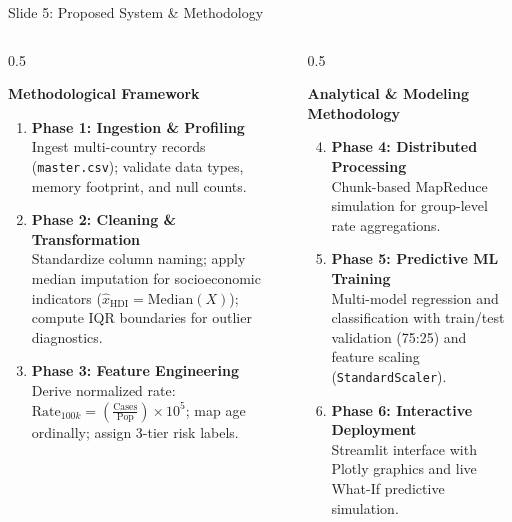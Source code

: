 \documentclass[10pt, aspectratio=169]{beamer}
\begin{document}
\begin{frame}{Slide 5: Proposed System \& Methodology}
    \begin{columns}[T]
        \begin{column}{0.5\textwidth}
            \begin{block}{\textbf{Methodological Framework}}
                \begin{enumerate}
                    \item \textbf{Phase 1: Ingestion \& Profiling} \\
                    Ingest multi-country records (\texttt{master.csv}); validate data types, memory footprint, and null counts.
                    \item \textbf{Phase 2: Cleaning \& Transformation} \\
                    Standardize column naming; apply median imputation for socioeconomic indicators ($\hat{x}_{\text{HDI}} = \text{Median}(X)$); compute IQR boundaries for outlier diagnostics.
                    \item \textbf{Phase 3: Feature Engineering} \\
                    Derive normalized rate: $\text{Rate}_{100k} = (\frac{\text{Cases}}{\text{Pop}}) \times 10^5$; map age ordinally; assign 3-tier risk labels.
                \end{enumerate}
            \end{block}
        \end{column}
        \begin{column}{0.5\textwidth}
            \begin{block}{\textbf{Analytical \& Modeling Methodology}}
                \begin{enumerate}
                    \setcounter{enumi}{3}
                    \item \textbf{Phase 4: Distributed Processing} \\
                    Chunk-based MapReduce simulation for group-level rate aggregations.
                    \item \textbf{Phase 5: Predictive ML Training} \\
                    Multi-model regression and classification with train/test validation (75:25) and feature scaling (\texttt{StandardScaler}).
                    \item \textbf{Phase 6: Interactive Deployment} \\
                    Streamlit interface with Plotly graphics and live What-If predictive simulation.
                \end{enumerate}
            \end{block}
        \end{column}
    \end{columns}
\end{frame}
\end{document}
